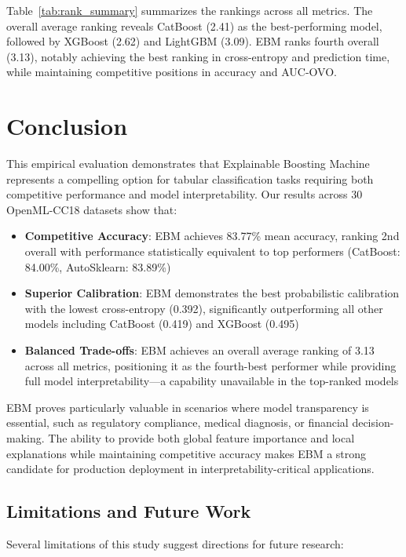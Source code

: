 \documentclass[12pt]{article}
\begin{document}
Table~\ref{tab:rank_summary} summarizes the rankings across all metrics. The overall average ranking reveals CatBoost (2.41) as the best-performing model, followed by XGBoost (2.62) and LightGBM (3.09). EBM ranks fourth overall (3.13), notably achieving the best ranking in cross-entropy and prediction time, while maintaining competitive positions in accuracy and AUC-OVO.


\section{Conclusion}

This empirical evaluation demonstrates that Explainable Boosting Machine represents a compelling option for tabular classification tasks requiring both competitive performance and model interpretability. Our results across 30 OpenML-CC18 datasets show that:

\begin{itemize}
\item \textbf{Competitive Accuracy}: EBM achieves 83.77\% mean accuracy, ranking 2nd overall with performance statistically equivalent to top performers (CatBoost: 84.00\%, AutoSklearn: 83.89\%)
\item \textbf{Superior Calibration}: EBM demonstrates the best probabilistic calibration with the lowest cross-entropy (0.392), significantly outperforming all other models including CatBoost (0.419) and XGBoost (0.495)
\item \textbf{Balanced Trade-offs}: EBM achieves an overall average ranking of 3.13 across all metrics, positioning it as the fourth-best performer while providing full model interpretability—a capability unavailable in the top-ranked models
\end{itemize}

EBM proves particularly valuable in scenarios where model transparency is essential, such as regulatory compliance, medical diagnosis, or financial decision-making. The ability to provide both global feature importance and local explanations while maintaining competitive accuracy makes EBM a strong candidate for production deployment in interpretability-critical applications.

\subsection{Limitations and Future Work}

Several limitations of this study suggest directions for future research:
\end{document}
